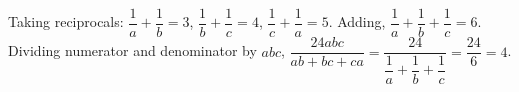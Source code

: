Taking reciprocals: $\dfrac1a+\dfrac1b=3$, $\dfrac1b+\dfrac1c=4$, $\dfrac1c+\dfrac1a=5$. Adding, $\dfrac1a+\dfrac1b+\dfrac1c=6$. Dividing numerator and denominator by $abc$, $\dfrac{24abc}{ab+bc+ca}=\dfrac{24}{\dfrac1a+\dfrac1b+\dfrac1c}=\dfrac{24}6=\boxed{4}$.
